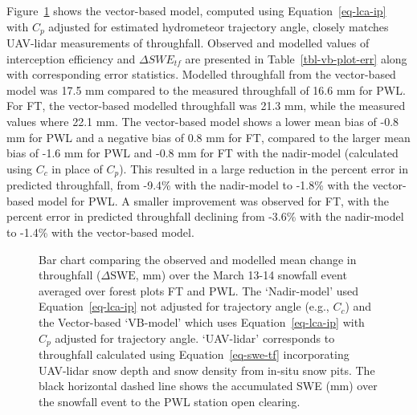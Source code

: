 \documentclass[
  letterpaper,
  DIV=11,
  numbers=noendperiod]{scrartcl}
\begin{document}
Figure~\ref{fig-event-tf} shows the vector-based model, computed using
Equation~\ref{eq-lca-ip} with \(C_p\) adjusted for estimated hydrometeor
trajectory angle, closely matches UAV-lidar measurements of throughfall.
Observed and modelled values of interception efficiency and
\(\Delta SWE_{tf}\) are presented in Table~\ref{tbl-vb-plot-err} along
with corresponding error statistics. Modelled throughfall from the
vector-based model was 17.5 mm compared to the measured throughfall of
16.6 mm for PWL. For FT, the vector-based modelled throughfall was 21.3
mm, while the measured values where 22.1 mm. The vector-based model
shows a lower mean bias of -0.8 mm for PWL and a negative bias of 0.8 mm
for FT, compared to the larger mean bias of -1.6 mm for PWL and -0.8 mm
for FT with the nadir-model (calculated using \(C_c\) in place of
\(C_p\)). This resulted in a large reduction in the percent error in
predicted throughfall, from -9.4\% with the nadir-model to -1.8\% with
the vector-based model for PWL. A smaller improvement was observed for
FT, with the percent error in predicted throughfall declining from
-3.6\% with the nadir-model to -1.4\% with the vector-based model.

\begin{figure}[H]


\caption{\label{fig-event-tf}Bar chart comparing the observed and
modelled mean change in throughfall (\(\Delta \text{SWE}\), mm) over the
March 13-14 snowfall event averaged over forest plots FT and PWL. The
`Nadir-model' used Equation~\ref{eq-lca-ip} not adjusted for trajectory
angle (e.g., \(C_c\)) and the Vector-based `VB-model' which uses
Equation~\ref{eq-lca-ip} with \(C_p\) adjusted for trajectory angle.
`UAV-lidar' corresponds to throughfall calculated using
Equation~\ref{eq-swe-tf} incorporating UAV-lidar snow depth and snow
density from in-situ snow pits. The black horizontal dashed line shows
the accumulated SWE (mm) over the snowfall event to the PWL station open
clearing.}

\end{figure}%
\end{document}
